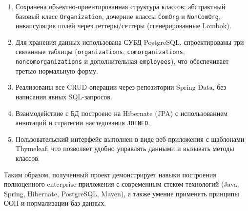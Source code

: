 \documentclass[oneside,a4paper,14pt]{extarticle}
\begin{document}
\begin{enumerate}
	\item Сохранена объектно-ориентированная структура классов: абстрактный базовый класс \texttt{Organization}, дочерние классы \texttt{ComOrg} и \texttt{NonComOrg}, инкапсуляция полей через геттеры/сеттеры (сгенерированные Lombok).
	\item Для хранения данных использована СУБД PostgreSQL, спроектированы три связанные таблицы (\texttt{organizations}, \texttt{comorganizations}, \texttt{noncomorganizations} и дополнительная \texttt{employees}), что обеспечивает третью нормальную форму.
	\item Реализованы все CRUD-операции через репозитории Spring Data, без написания явных SQL-запросов.
	\item Взаимодействие с БД построено на Hibernate (JPA) с использованием аннотаций и стратегии наследования \texttt{JOINED}.
	\item Пользовательский интерфейс выполнен в виде веб-приложения с шаблонами Thymeleaf, что позволяет удобно управлять данными и вызывать методы классов.
\end{enumerate}

Таким образом, полученный проект демонстрирует навыки построения полноценного enterprise-приложения с современным стеком технологий (Java, Spring, Hibernate, PostgreSQL, Maven), а также умение применять принципы ООП и нормализации баз данных.
\end{document}
